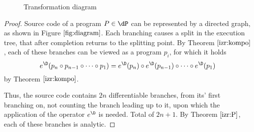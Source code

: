\begin{figure}
\begin{center}
\caption{Transformation diagram} \label{fig:diagram}
\end{center}
\end{figure}


\begin{proof}
  Source code of a program $P\in\dP$ can be represented by a directed graph, as shown in Figure $\ref{fig:diagram}$. Each branching causes a split in the execution tree, that after completion returns to the splitting point.
  By Theorem $\ref{izr:kompo}$, each of these branches can be viewed as a program $p_i$, for which it holds $$e^\D(p_n\circ p_{n-1}\circ\cdots\circ p_1)=e^\D(p_n)\circ e^\D(p_{n-1})\circ\cdots\circ e^\D(p_1)$$ by Theorem $\ref{izr:kompo}$.
  
  Thus, the source code contains $2n$ differentiable branches, from its' first branching on, not counting the branch leading up to it, upon which the application of the operator $e^\D$ is needed. Total of $2n+1$. By Theorem $\ref{izr:P}$, each of these branches is analytic.
\end{proof}





